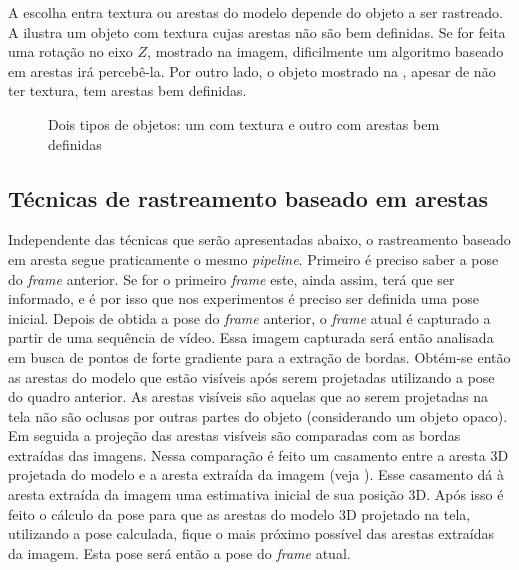 A escolha entra textura ou arestas do modelo depende do objeto a ser rastreado. A  ilustra um objeto com textura cujas arestas não são bem definidas. Se for feita uma rotação no eixo $Z$, mostrado na imagem, dificilmente um algoritmo baseado em arestas irá percebê-la. Por outro lado, o objeto mostrado na , apesar de não ter textura, tem arestas bem definidas.

\begin{figure}[!ht]
	\centerline{
		\hfil
	}
	\caption{Dois tipos de objetos: um com textura e outro com arestas bem definidas}
\end{figure}

\subsection{Técnicas de rastreamento baseado em arestas}

Independente das técnicas que serão apresentadas abaixo, o rastreamento baseado em aresta segue praticamente o mesmo \emph{pipeline}. Primeiro é preciso saber a pose do \emph{frame} anterior. Se for o primeiro \emph{frame} este, ainda assim, terá que ser informado, e é por isso que nos experimentos é preciso ser definida uma pose inicial. Depois de obtida a pose do \emph{frame} anterior, o \emph{frame} atual é capturado a partir de uma sequência de vídeo. Essa imagem capturada será então analisada em busca de pontos de forte gradiente para a extração de bordas. Obtém-se então as arestas do modelo que estão visíveis após serem projetadas utilizando a pose do quadro anterior. As arestas visíveis são aquelas que ao serem projetadas na tela não são oclusas por outras partes do objeto (considerando um objeto opaco). Em seguida a projeção das arestas visíveis são comparadas com as bordas extraídas das imagens. Nessa comparação é feito um casamento entre a aresta 3D projetada do modelo e a aresta extraída da imagem (veja ). Esse casamento dá à aresta extraída da imagem uma estimativa inicial de sua posição 3D. Após isso é feito o cálculo da pose para que as arestas do modelo 3D projetado na tela, utilizando a pose calculada, fique o mais próximo possível das arestas extraídas da imagem. Esta pose será então a pose do \emph{frame} atual.

